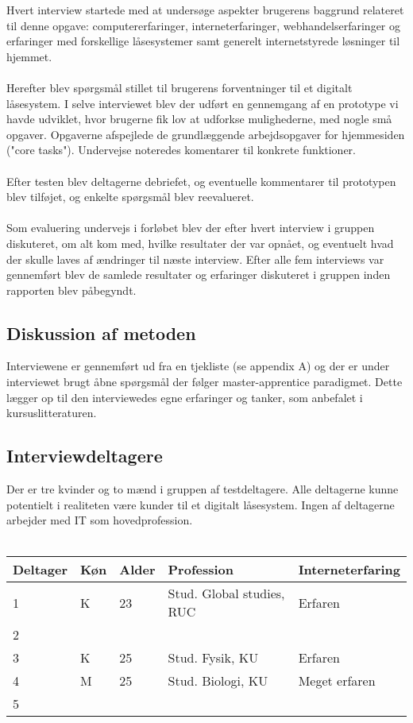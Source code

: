 \documentclass[a4paper,12pt]{article}
\begin{document}
Hvert interview startede med at undersøge aspekter brugerens baggrund relateret til denne opgave:
computererfaringer, interneterfaringer, webhandelserfaringer og erfaringer med forskellige låsesystemer samt generelt internetstyrede løsninger til hjemmet.
\\ \\
Herefter blev spørgsmål stillet til brugerens forventninger til et digitalt låsesystem.
I selve interviewet blev der udført en gennemgang af en prototype vi havde udviklet, hvor brugerne fik lov at udforkse mulighederne, med nogle små opgaver.
Opgaverne afspejlede de grundlæggende arbejdsopgaver for hjemmesiden ("core tasks"). Undervejse noteredes komentarer til konkrete funktioner.
\\ \\
Efter testen blev deltagerne debriefet, og eventuelle kommentarer til prototypen blev tilføjet, og enkelte spørgsmål blev reevalueret.
\\ \\
Som evaluering undervejs i forløbet blev der efter hvert interview i gruppen diskuteret, om alt
kom med, hvilke resultater der var opnået, og eventuelt hvad der skulle laves af ændringer til
næste interview. Efter alle fem interviews var gennemført blev de samlede resultater og erfaringer
diskuteret i gruppen inden rapporten blev påbegyndt.


\subsection{Diskussion af metoden}

Interviewene er gennemført ud fra en tjekliste (se appendix A) og der er under interviewet brugt
åbne spørgsmål der følger master-apprentice paradigmet. Dette lægger op til den interviewedes
egne erfaringer og tanker, som anbefalet i kursuslitteraturen.


\subsection{Interviewdeltagere}

Der er tre kvinder og to mænd i gruppen af testdeltagere. Alle deltagerne kunne potentielt i
realiteten være kunder til et digitalt låsesystem. Ingen af deltagerne arbejder med IT som
hovedprofession.
\\  \\
\begin{tabular}{|l|l|l|l|l|}
	\hline Deltager & Køn & Alder & Profession & Interneterfaring \\
	\hline 1 & K & 23  & Stud. Global studies, RUC & Erfaren \\
	\hline 2 & & & & \\
	\hline 3 & K & 25 & Stud. Fysik, KU & Erfaren \\
	\hline 4 & M & 25 & Stud. Biologi, KU & Meget erfaren \\
	\hline 5 & & & & \\
	\hline
\end{tabular}
\\ \\
\end{document}

